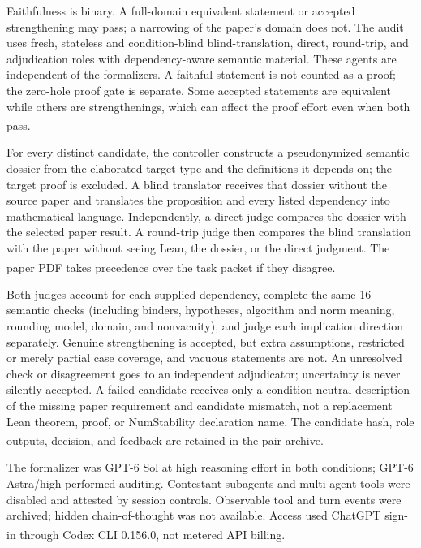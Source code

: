 \documentclass[10pt,a4paper]{article}
\newcommand{\src}[1]{\textsuperscript{\cite{#1}}}
\begin{document}
Faithfulness is binary. A full-domain equivalent statement or accepted
strengthening may pass; a narrowing of the paper's domain does not. The audit
uses fresh, stateless and condition-blind blind-translation, direct,
round-trip, and adjudication roles with dependency-aware semantic material.
These agents are independent of the formalizers. A faithful statement is not
counted as a proof; the zero-hole proof gate is separate. Some accepted
statements are equivalent while others are strengthenings, which can affect
the proof effort even when both pass.\src{protocol,evidence,taskledger}

For every distinct candidate, the controller constructs a pseudonymized
semantic dossier from the elaborated target type and the definitions it
depends on; the target proof is excluded. A blind translator receives that
dossier without the source paper and translates the proposition and every
listed dependency into mathematical language. Independently, a direct judge
compares the dossier with the selected paper result. A round-trip judge then
compares the blind translation with the paper without seeing Lean, the
dossier, or the direct judgment. The paper PDF takes precedence over the
task packet if they disagree.\src{protocol,evidence}

Both judges account for each supplied dependency, complete the same 16
semantic checks (including binders, hypotheses, algorithm and norm meaning,
rounding model, domain, and nonvacuity), and judge each implication direction
separately. Genuine strengthening is accepted, but extra assumptions,
restricted or merely partial case coverage, and vacuous statements are not.
An unresolved check or disagreement goes to an independent adjudicator;
uncertainty is never silently accepted. A failed candidate receives only a
condition-neutral description of the missing paper requirement and candidate
mismatch, not a replacement Lean theorem, proof, or NumStability declaration
name. The candidate hash, role outputs, decision, and feedback are retained
in the pair archive.\src{protocol,evidence}

The formalizer was GPT-6 Sol at high reasoning effort in both conditions;
GPT-6 Astra/high performed auditing. Contestant subagents and multi-agent
tools were disabled and attested by session controls. Observable tool and
turn events were archived; hidden chain-of-thought was not available.
Access used ChatGPT sign-in through Codex CLI 0.156.0, not metered API
billing.\src{metrics,evidence,runtimesnapshot}
\end{document}
